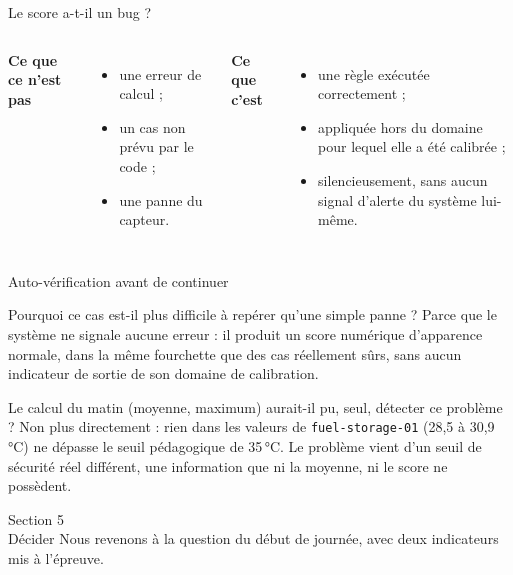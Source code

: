 \documentclass[aspectratio=169]{beamer}
\begin{document}
\begin{frame}{Le score a-t-il un bug ?}
  \begin{columns}[T]
    \textbf{Ce que ce n'est pas}
    \begin{itemize}
      \item une erreur de calcul ;
      \item un cas non prévu par le code ;
      \item une panne du capteur.
    \end{itemize}
    \textbf{Ce que c'est}
    \begin{itemize}
      \item une règle exécutée correctement ;
      \item appliquée hors du domaine pour lequel elle a été calibrée ;
      \item silencieusement, sans aucun signal d'alerte du système lui-même.
    \end{itemize}
  \end{columns}
  \vfill
\end{frame}

\begin{frame}{Auto-vérification avant de continuer}
  \small
  \begin{block}{Pourquoi ce cas est-il plus difficile à repérer qu'une simple panne ?}
    Parce que le système ne signale aucune erreur : il produit un score numérique d'apparence normale, dans la même fourchette que des cas réellement sûrs, sans aucun indicateur de sortie de son domaine de calibration.
  \end{block}
  \begin{block}{Le calcul du matin (moyenne, maximum) aurait-il pu, seul, détecter ce problème ?}
    Non plus directement : rien dans les valeurs de \texttt{fuel-storage-01} (28,5 à 30,9\,°C) ne dépasse le seuil pédagogique de 35\,°C. Le problème vient d'un seuil de sécurité réel différent, une information que ni la moyenne, ni le score ne possèdent.
  \end{block}
\end{frame}

\begin{frame}[plain]
  \centering
  \Huge Section 5\\[3mm]
  \Large Décider
  \vfill
  \normalsize Nous revenons à la question du début de journée, avec deux indicateurs mis à l'épreuve.
\end{frame}
\end{document}
